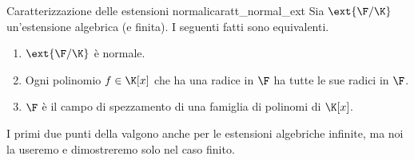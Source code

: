 \begin{proposition}
    {Caratterizzazione delle estensioni normali}{caratt_normal_ext}
    Sia $\ext{\F / \K}$ un'estensione algebrica (e finita). I seguenti fatti sono equivalenti.
    \begin{enumerate}
        \item $\ext{\F / \K}$ è normale.
        \item Ogni polinomio $f \in \K[x]$ che ha una radice in $\F$ ha tutte le sue radici in $\F$.
        \item $\F$ è il campo di spezzamento di una famiglia di polinomi di $\K[x]$.  
    \end{enumerate}
\end{proposition}
\begin{remark}
    I primi due punti della  valgono anche per le estensioni algebriche infinite, ma noi la useremo e dimostreremo solo nel caso finito.
\end{remark}
